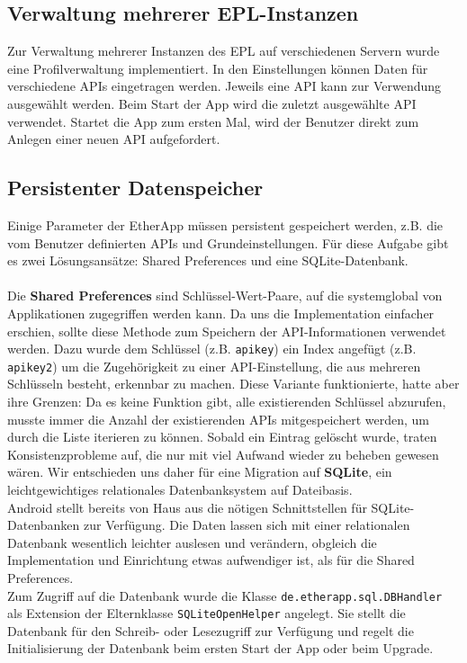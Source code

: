 \subsection{Verwaltung mehrerer EPL-Instanzen}
Zur Verwaltung mehrerer Instanzen des EPL auf verschiedenen Servern wurde eine Profilverwaltung implementiert.
In den Einstellungen können Daten für verschiedene APIs eingetragen werden.
Jeweils eine API kann zur Verwendung ausgewählt werden.
Beim Start der App wird die zuletzt ausgewählte API verwendet.
Startet die App zum ersten Mal, wird der Benutzer direkt zum Anlegen einer neuen API aufgefordert.


\subsection{Persistenter Datenspeicher}
Einige Parameter der EtherApp müssen persistent gespeichert werden, z.B. die vom Benutzer definierten APIs und Grundeinstellungen.
Für diese Aufgabe gibt es zwei Lösungsansätze: Shared Preferences und eine SQLite-Datenbank.\\
\\
Die \textbf{Shared Preferences} sind Schlüssel-Wert-Paare, auf die systemglobal von Applikationen zugegriffen werden kann.
Da uns die Implementation einfacher erschien, sollte diese Methode zum Speichern der API-Informationen verwendet werden.
Dazu wurde dem Schlüssel (z.B. \texttt{apikey}) ein Index angefügt (z.B. \texttt{apikey2}) um die Zugehörigkeit zu einer API-Einstellung, die aus mehreren Schlüsseln besteht, erkennbar zu machen.
Diese Variante funktionierte, hatte aber ihre Grenzen: Da es keine Funktion gibt, alle existierenden Schlüssel abzurufen, musste immer die Anzahl der existierenden APIs mitgespeichert werden, um durch die Liste iterieren zu können.
Sobald ein Eintrag gelöscht wurde, traten Konsistenzprobleme auf, die nur mit viel Aufwand wieder zu beheben gewesen wären.
Wir entschieden uns daher für eine Migration auf \textbf{SQLite}, ein leichtgewichtiges relationales Datenbanksystem auf Dateibasis.\\
Android stellt bereits von Haus aus die nötigen Schnittstellen für SQLite-Datenbanken zur Verfügung.
Die Daten lassen sich mit einer relationalen Datenbank wesentlich leichter auslesen und verändern, obgleich die Implementation und Einrichtung etwas aufwendiger ist, als für die Shared Preferences.\\
Zum Zugriff auf die Datenbank wurde die Klasse \texttt{de.etherapp.sql.DBHandler} als Extension der Elternklasse \texttt{SQLiteOpenHelper} angelegt.
Sie stellt die Datenbank für den Schreib- oder Lesezugriff zur Verfügung und regelt die Initialisierung der Datenbank beim ersten Start der App oder beim Upgrade.



